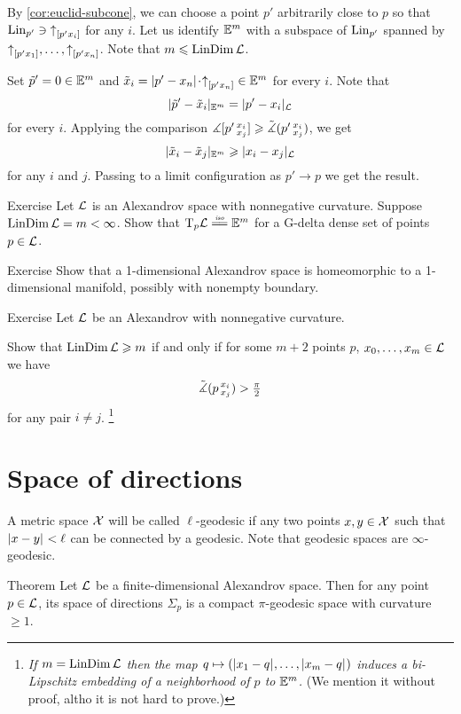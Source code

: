 By \ref{cor:euclid-subcone}, we can choose a point $p'$ arbitrarily close to $p$ so that 
$\mathop{\rm Lin}\nolimits_{p'}\ni {\uparrow}_{[{p'}{x_i}]}$ for any $i$.
Let us identify $\mathbb{E}^m$ with a subspace of $\mathop{\rm Lin}\nolimits_{p'}$ spanned by ${\uparrow}_{[{p'}{x_1}]},\dots,{\uparrow}_{[{p'}{x_n}]}$.
Note that $m\leqslant \mathop{\rm LinDim}\nolimits\mathcal{L}$.

Set $\tilde p'=0\in \mathbb{E}^m$ and $\tilde x_i=\dist{p'}{x_n}{}\cdot\dir{p'}{x_n}\in \EE^m$ for every $i$.
Note that 
\[|\tilde p'-\tilde x_i|_{\mathbb{E}^m}=| p'- x_i|_{\mathcal{L}}\]
for every $i$.
Applying the comparison $\measuredangle[p'\,{}^{x_i}_{x_j}]\geqslant \tilde\measuredangle(p'\,{}^{x_i}_{x_j})$, we get
\[|\tilde x_i-\tilde x_j|_{\mathbb{E}^m}\geqslant |x_i- x_j|_{\mathcal{L}}\]
for any $i$ and $j$.
Passing to a limit configuration as $p'\to p$ we get the result.
\qeds

\begin{thm}{Exercise}\label{ex:tangent=Em}
Let $\mathcal{L}$ is an Alexandrov space with nonnegative curvature.
Suppose $\LinDim\spc{L}\z=m<\infty$.
Show that $\T_p\spc{L}\iso \EE^m$ for a G-delta dense set of points $p\in\mathcal{L}$.
\end{thm}

\begin{thm}{Exercise}\label{ex:dim=1}
Show that a 1-dimensional Alexandrov space is homeomorphic to a 1-dimensional manifold, possibly with nonempty boundary.
\end{thm}


\begin{thm}{Exercise}\label{ex:resporka}
Let $\mathcal{L}$ be an Alexandrov with nonnegative curvature.

Show that $\mathop{\rm LinDim}\nolimits \mathcal{L}\geqslant m$ if and only if for some $m+2$ points $p$, $x_0,\z\dots, x_{m}\in \spc{L}$
we have
\[\tilde\measuredangle(p\,{}^{x_i}_{x_j})>\tfrac\pi2\]
for any pair $i\ne j$.%
\footnote{\textit{If $m=\mathop{\rm LinDim}\nolimits \mathcal{L}$ then the map $q\mapsto (\dist{x_1}{q}{},\dots,\dist{x_m}{q}{})$ induces a bi-Lipschitz embedding of a neighborhood of $p$ to $\mathbb{E}^m$.}
(We mention it without proof, altho it is not hard to prove.)}
\end{thm}

\section{Space of directions}

A metric space $\mathcal{X}$ will be called $\ell$-geodesic 
if any two points $x,y\in\mathcal{X}$ such that $\dist{x}{y}{}<\ell$ can be connected by a geodesic.
Note that geodesic spaces are $\infty$-geodesic.

\begin{thm}{Theorem}\label{thm:finite-space-of-directions}
Let $\mathcal{L}$ be a finite-dimensional Alexandrov space.
Then for any point $p\in \mathcal{L}$, its space of directions $\Sigma_p$ is a compact $\pi$-geodesic space with curvature $\ge1$.
\end{thm}


